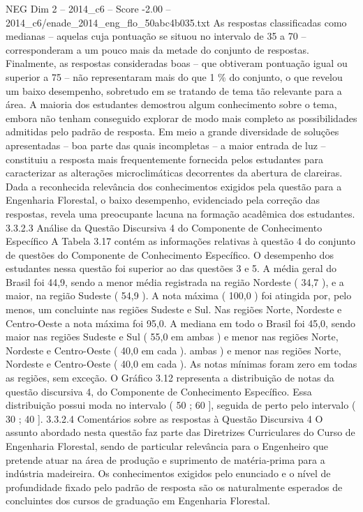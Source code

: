 \begin{textsample}{NEG Dim 2 – 2014\_c6 – Score -2.00 – 2014\_c6/enade\_2014\_eng\_flo\_50abc4b035.txt}
As respostas classificadas como medianas – aquelas cuja pontuação se situou no intervalo de 35 a 70 – corresponderam a um pouco mais da metade do conjunto de respostas.
Finalmente, as respostas consideradas boas – que obtiveram pontuação igual ou superior a 75 – não representaram mais do que 1 \% do conjunto, o que revelou um baixo desempenho, sobretudo em se tratando de tema tão relevante para a área.
A maioria dos estudantes demostrou algum conhecimento sobre o tema, embora não tenham conseguido explorar de modo mais completo as possibilidades admitidas pelo padrão de resposta.
Em meio a grande diversidade de soluções apresentadas – boa parte das quais incompletas – a maior entrada de luz – constituiu a resposta mais frequentemente fornecida pelos estudantes para caracterizar as alterações microclimáticas decorrentes da abertura de clareiras.
Dada a reconhecida relevância dos conhecimentos exigidos pela questão para a Engenharia Florestal, o baixo desempenho, evidenciado pela correção das respostas, revela uma preocupante lacuna na formação acadêmica dos estudantes. 3.3.2.3 Análise da Questão Discursiva 4 do Componente de Conhecimento Específico A Tabela 3.17 contém as informações relativas à questão 4 do conjunto de questões do Componente de Conhecimento Específico.
O desempenho dos estudantes nessa questão foi superior ao das questões 3 e 5.
A média geral do Brasil foi 44,9, sendo a menor média registrada na região Nordeste ( 34,7 ), e a maior, na região Sudeste ( 54,9 ).
A nota máxima ( 100,0 ) foi atingida por, pelo menos, um concluinte nas regiões Sudeste e Sul.
Nas regiões Norte, Nordeste e Centro-Oeste a nota máxima foi 95,0.
A mediana em todo o Brasil foi 45,0, sendo maior nas regiões Sudeste e Sul ( 55,0 em ambas ) e menor nas regiões Norte, Nordeste e Centro-Oeste ( 40,0 em cada ). ambas ) e menor nas regiões Norte, Nordeste e Centro-Oeste ( 40,0 em cada ).
As notas mínimas foram zero em todas as regiões, sem exceção.
O Gráfico 3.12 representa a distribuição de notas da questão discursiva 4, do Componente de Conhecimento Específico.
Essa distribuição possui moda no intervalo ( 50 ; 60 ], seguida de perto pelo intervalo ( 30 ; 40 ]. 3.3.2.4 Comentários sobre as respostas à Questão Discursiva 4 O assunto abordado nesta questão faz parte das Diretrizes Curriculares do Curso de Engenharia Florestal, sendo de particular relevância para o Engenheiro que pretende atuar na área de produção e suprimento de matéria-prima para a indústria madeireira.
Os conhecimentos exigidos pelo enunciado e o nível de profundidade fixado pelo padrão de resposta são os naturalmente esperados de concluintes dos cursos de graduação em Engenharia Florestal.

\end{textsample}
